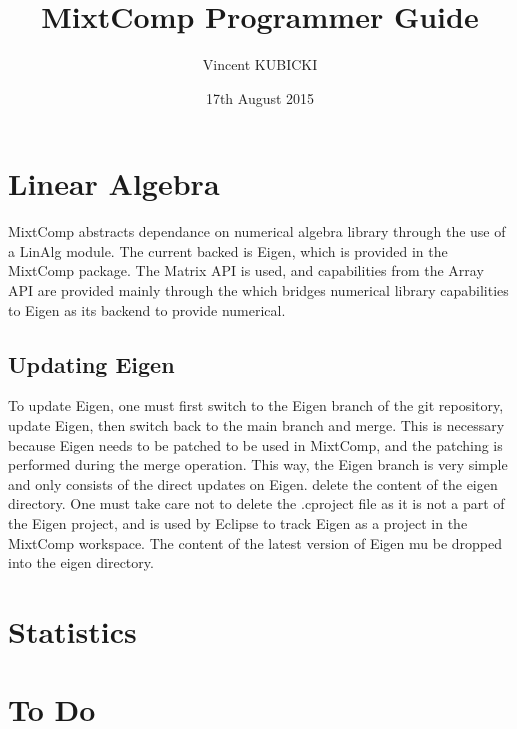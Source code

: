 \documentclass{article}
\title{MixtComp Programmer Guide}
\author{Vincent KUBICKI}
\date{17th August 2015}
\begin{document}
\maketitle

\section{Linear Algebra}

MixtComp abstracts dependance on numerical algebra library through the use of a LinAlg module. The current backed is Eigen, which is provided in the MixtComp package. The Matrix API is used, and capabilities from the Array API are provided mainly through the  which bridges numerical library capabilities to Eigen as its backend to provide numerical.

\subsection{Updating Eigen}

To update Eigen, one must first switch to the Eigen branch of the git repository, update Eigen, then switch back to the main branch and merge. This is necessary because Eigen needs to be patched to be used in MixtComp, and the patching is performed during the merge operation. This way, the Eigen branch is very simple and only consists of the direct updates on Eigen. delete the content of the eigen directory. One must take care not to delete the .cproject file as it is not a part of the Eigen project, and is used by Eclipse to track Eigen as a project in the MixtComp workspace. The content of the latest version of Eigen mu be dropped into the eigen directory.

\section{Statistics}

\section{To Do}
\end{document}
